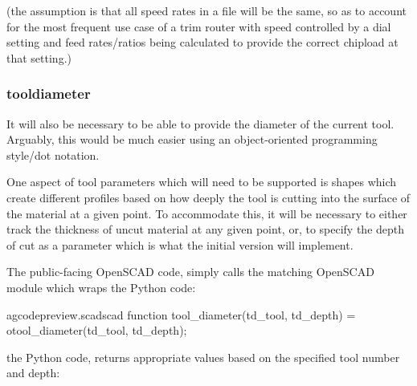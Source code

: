 \documentclass{ltxdoc}
\begin{document}
\noindent (the assumption is that all speed rates in a file will be the same, so as to account for the most frequent use case of a trim router with speed controlled by a dial setting and feed rates/ratios being calculated to provide the correct chipload at that setting.)

\subsubsection{tooldiameter}

It will also be necessary to be able to provide the diameter of the current tool. Arguably, this would be much easier using an object-oriented programming style/dot notation.

One aspect of tool parameters which will need to be supported is shapes which create different profiles based on how deeply the tool is cutting into the surface of the material at a given point. To accommodate this, it will be necessary to either track the thickness of uncut material at any given point, or, to specify the depth of cut as a parameter which is what the initial version will implement.

The public-facing OpenSCAD code,  simply calls the matching OpenSCAD module which wraps the Python code:
 
\lstset{firstnumber=\thegcpscad}
\begin{writecode}{a}{gcodepreview.scad}{scad}
function tool_diameter(td_tool, td_depth) = otool_diameter(td_tool, td_depth);

\end{writecode}
\addtocounter{gcpscad}{2}

\noindent the Python code,  returns 
appropriate values based on the specified tool number and depth:
 
\end{document}
